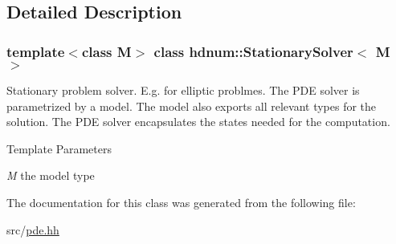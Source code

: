 \subsection{Detailed Description}
\subsubsection*{template$<$class M$>$ class hdnum::StationarySolver$<$ M $>$}

Stationary problem solver. E.g. for elliptic problmes. The PDE solver is parametrized by a model. The model also exports all relevant types for the solution. The PDE solver encapsulates the states needed for the computation.


\begin{DoxyTemplParams}{Template Parameters}
\item[{\em M}]the model type \end{DoxyTemplParams}


The documentation for this class was generated from the following file:\begin{DoxyCompactItemize}
\item 
src/\hyperlink{pde_8hh}{pde.hh}\end{DoxyCompactItemize}
